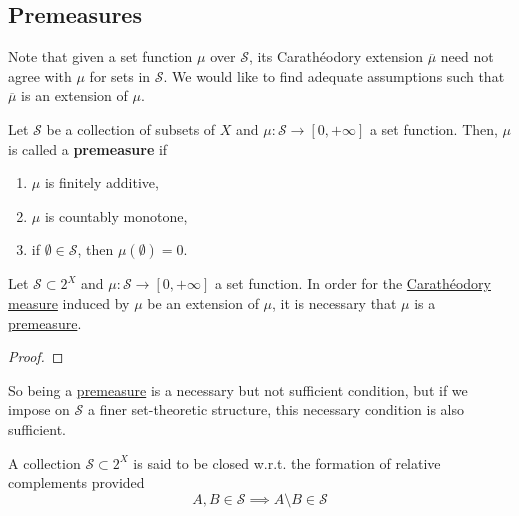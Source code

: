 \subsection{Premeasures} 

  Note that given a set function $\mu$ over $\mathcal{S}$, its Carathéodory extension $\overline{\mu}$ need not agree with $\mu$ for sets in $\mathcal{S}$. We would like to find adequate assumptions such that $\overline{\mu}$ is an extension of $\mu$. 

  \begin{definition}[Premeasure]
    \label{def:premeasure}
    Let $\mathcal{S}$ be a collection of subsets of $X$ and $\mu: \mathcal{S} \to [0, +\infty]$ a set function. Then, $\mu$ is called a \textbf{premeasure} if  
    \begin{enumerate}
      \item $\mu$ is finitely additive, 
      \item $\mu$ is countably monotone, 
      \item if $\emptyset \in \mathcal{S}$, then $\mu(\emptyset) = 0$. 
    \end{enumerate}
  \end{definition}

  \begin{theorem}
    \label{thm:premeasure-condition-for-caratheodory-measure}
    Let $\mathcal{S} \subset 2^X$ and $\mu: \mathcal{S} \to [0, +\infty]$ a set function. In order for the \hyperref[def:caratheodory-measure]{Carathéodory measure} induced by $\mu$ be an extension of $\mu$, it is necessary that $\mu$ is a \hyperref[def:premeasure]{premeasure}.  
  \end{theorem}
  \begin{proof}
    
  \end{proof}

  So being a \hyperref[def:premeasure]{premeasure} is a necessary but not sufficient condition, but if we impose on $\mathcal{S}$ a finer set-theoretic structure, this necessary condition is also sufficient. 

  \begin{definition}
    \label{def:closure-under-relative-complements}
    A collection $\mathcal{S} \subset 2^X$ is said to be closed w.r.t. the formation of relative complements provided 
    \begin{equation}
      A, B \in \mathcal{S} \implies A \setminus B \in \mathcal{S}
    \end{equation}
  \end{definition}

